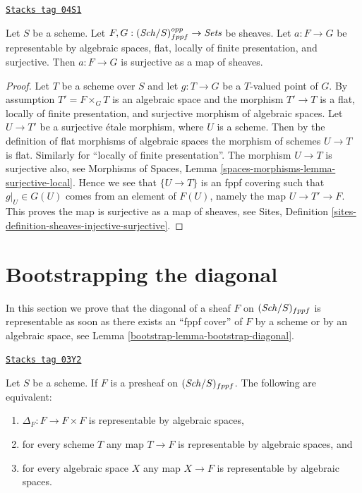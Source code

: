 \begin{lemma}
\label{bootstrap-lemma-surjective-flat-locally-finite-presentation}
\href{https://stacks.math.columbia.edu/tag/04S1}{\texttt{Stacks tag 04S1}}

Let $S$ be a scheme.
Let $F, G : (\mathit{Sch}/S)_{fppf}^{opp} \to \textit{Sets}$ be sheaves.
Let $a : F \to G$ be representable by algebraic spaces, flat,
locally of finite presentation, and surjective.
Then $a : F \to G$ is surjective as a map of sheaves.
\end{lemma}

\begin{proof}
Let $T$ be a scheme over $S$ and let $g : T \to G$ be a $T$-valued point of
$G$. By assumption $T' = F \times_G T$ is an algebraic space and
the morphism $T' \to T$ is a flat, locally of finite presentation, and
surjective morphism of algebraic spaces.
Let $U \to T'$ be a surjective \'etale morphism, where $U$ is a scheme.
Then by the definition of flat morphisms of algebraic spaces
the morphism of schemes $U \to T$ is flat. Similarly for
``locally of finite presentation''. The morphism $U \to T$ is surjective
also, see
Morphisms of Spaces, Lemma \ref{spaces-morphisms-lemma-surjective-local}.
Hence we see that $\{U \to T\}$ is an fppf covering such
that $g|_U \in G(U)$ comes from an element of $F(U)$, namely
the map $U \to T' \to F$. This proves the map is surjective as
a map of sheaves, see
Sites, Definition \ref{sites-definition-sheaves-injective-surjective}.
\end{proof}

\section{Bootstrapping the diagonal}
\label{bootstrap-section-bootstrap-diagonal}
In this section we prove that the diagonal of a sheaf $F$ on
$(\mathit{Sch}/S)_{fppf}$ is representable as soon as there exists
an ``fppf cover'' of $F$ by a scheme or by an algebraic space, see
Lemma \ref{bootstrap-lemma-bootstrap-diagonal}.

\begin{lemma}
\label{bootstrap-lemma-representable-diagonal}
\href{https://stacks.math.columbia.edu/tag/03Y2}{\texttt{Stacks tag 03Y2}}


Let $S$ be a scheme.
If $F$ is a presheaf on $(\mathit{Sch}/S)_{fppf}$.
The following are equivalent:
\begin{enumerate}
\item $\Delta_F : F \to F \times F$ is representable by algebraic spaces,
\item for every scheme $T$ any map $T \to F$ is representable by algebraic
spaces, and
\item for every algebraic space $X$ any map $X \to F$ is representable
by algebraic spaces.
\end{enumerate}
\end{lemma}

